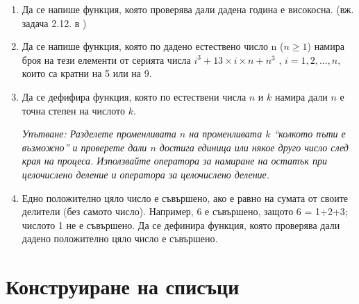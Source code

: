 \begin{enumerate}[]
  \item Да се напише функция, която проверява дали дадена година е високосна. (вж. задача 2.12. в \cite{sbornik})
  
  \item Да се напише функция, която по дадено естествено число n ($n \geq 1$) намира броя на тези елементи от серията числа $i^3 + 13 \times i \times n + n^3$ , $i = 1, 2, ..., n$, които са кратни на 5 или на 9.

  \item Да се дефифира функция, която по естествени числа $n$ и $k$ намира дали $n$ е точна степен на числото $k$.

  \textit{Упътване: Разделете променливата $n$ на променливата $k$ ``колкото пъти е възможно'' и проверете дали $n$ достига единица или някое друго число след края на процеса. Използвайте оператора за намиране на остатък при целочислено деление и оператора за целочислено деление.}

  \item Едно положително цяло число е съвършено, ако е равно на сумата от своите делители (без самото число). Например, 6 е съвършено, защото 6 = 1+2+3; числото 1 не е съвършено. Да се дефинира функция, която проверява дали дадено положително цяло число е съвършено.

\end{enumerate}

  \section {Конструиране на списъци}

